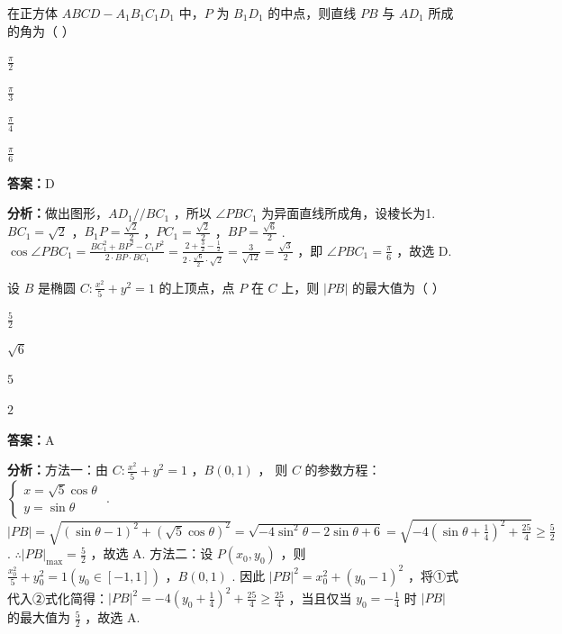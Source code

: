 \begin{question}[points=5]
在正方体 $ABCD-A_1B_1C_1D_1$ 中，$P$ 为 $B_1D_1$ 的中点，则直线 $PB$ 与 $AD_1$ 所成的角为（ ）
\begin{choices}
  \item $\frac{\pi}{2}$
  \item $\frac{\pi}{3}$
  \item $\frac{\pi}{4}$
  \item $\frac{\pi}{6}$
\end{choices}
\begin{solution}
\textbf{答案：}D

\textbf{分析：}做出图形，$AD_1 // BC_1$ ，所以 $\angle PBC_1$ 为异面直线所成角，设棱长为1.
$BC_1 = \sqrt{2}$ ，$B_1P = \frac{\sqrt{2}}{2}$ ，$PC_1 = \frac{\sqrt{2}}{2}$ ，$BP = \frac{\sqrt{6}}{2}$ .
$\cos\angle PBC_1 = \frac{BC_1^2 + BP^2 - C_1P^2}{2\cdot BP \cdot BC_1} = \frac{2 + \frac{3}{2} - \frac{1}{2}}{2\cdot\frac{\sqrt{6}}{2}\cdot\sqrt{2}} = \frac{3}{\sqrt{12}} = \frac{\sqrt{3}}{2}$ ，即 $\angle PBC_1 = \frac{\pi}{6}$ ，故选 D.
\end{solution}
\end{question}

\begin{question}[points=5]
设 $B$ 是椭圆 $C: \frac{x^2}{5} + y^2 = 1$ 的上顶点，点 $P$ 在 $C$ 上，则 $|PB|$ 的最大值为（ ）
\begin{choices}
  \item $\frac{5}{2}$
  \item $\sqrt{6}$
  \item $5$
  \item $2$
\end{choices}
\begin{solution}
\textbf{答案：}A

\textbf{分析：}方法一：由 $C: \frac{x^2}{5} + y^2 = 1$ ，$B(0,1)$ ，
则 $C$ 的参数方程：$\begin{cases} x = \sqrt{5}\cos\theta \\ y = \sin\theta \end{cases}$ .
$|PB| = \sqrt{(\sin\theta - 1)^2 + (\sqrt{5}\cos\theta)^2} = \sqrt{-4\sin^2\theta - 2\sin\theta + 6} = \sqrt{-4(\sin\theta + \frac{1}{4})^2 + \frac{25}{4}} \ge \frac{5}{2}$ .
$\therefore |PB|_{\max} = \frac{5}{2}$ ，故选 A.
方法二：设 $P(x_0,y_0)$ ，则 $\frac{x_0^2}{5} + y_0^2 = 1 (y_0 \in [-1,1])$ ，$B(0,1)$ .
因此 $|PB|^2 = x_0^2 + (y_0 - 1)^2$ ，将①式代入②式化简得：$|PB|^2 = -4(y_0 + \frac{1}{4})^2 + \frac{25}{4} \ge \frac{25}{4}$ ，当且仅当 $y_0 = -\frac{1}{4}$ 时 $|PB|$ 的最大值为 $\frac{5}{2}$ ，故选 A.
\end{solution}
\end{question}

